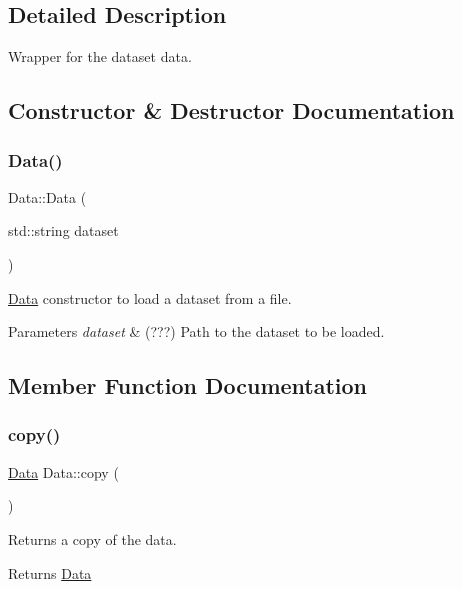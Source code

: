 \subsection{Detailed Description}
Wrapper for the dataset data. 

\subsection{Constructor \& Destructor Documentation}
\mbox{\label{class_data_acdbe72be259faa3c285b8e0f6dc89a94}} 
\subsubsection{\texorpdfstring{Data()}{Data()}}
{\footnotesize\ttfamily Data\+::\+Data (\begin{DoxyParamCaption}\item[{std\+::string}]{dataset }\end{DoxyParamCaption})}



\hyperlink{class_data}{Data} constructor to load a dataset from a file. 


\begin{DoxyParams}{Parameters}
{\em dataset} & (???) Path to the dataset to be loaded. \\
\hline
\end{DoxyParams}


\subsection{Member Function Documentation}
\mbox{\label{class_data_afb7687021aa7d5f1ecae464eee601710}} 
\subsubsection{\texorpdfstring{copy()}{copy()}}
{\footnotesize\ttfamily \hyperlink{class_data}{Data} Data\+::copy (\begin{DoxyParamCaption}{ }\end{DoxyParamCaption})}



Returns a copy of the data. 

\begin{DoxyReturn}{Returns}
\hyperlink{class_data}{Data} 
\end{DoxyReturn}
\mbox{\label{class_data_a0391940729a8023ea9b154132a854d35}} 
